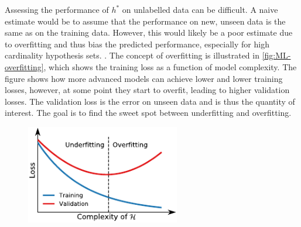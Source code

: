 Assessing the performance of $h^*$ on unlabelled data can be difficult. A naive estimate would be to assume that the performance on new, unseen data is the same as on the training data. However, this would likely be a poor estimate due to overfitting and thus bias the predicted performance, especially for high cardinality hypothesis sets. \autocite{abu-mostafaLearningData2012a}. The concept of overfitting is illustrated in \autoref{fig:ML-overfitting}, which shows the training loss as a function of model complexity. The figure shows how more advanced models can achieve lower and lower training losses, however, at some point they start to overfit, leading to higher validation losses. The validation loss is the error on unseen data and is thus the quantity of interest. The goal is to find the sweet spot between underfitting and overfitting.

\begin{figure}[htbp]
    \centering
    \includegraphics[width=0.6\textwidth]{figures/MasterThesis-overfitting.pdf}
\end{figure}

